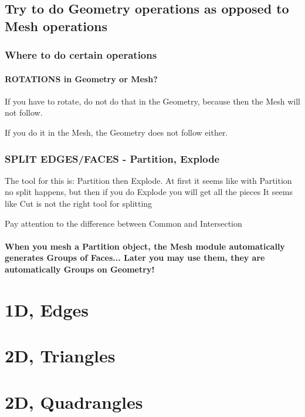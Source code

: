 \documentclass[10pt]{book}
\begin{document}
  
  
  \subsection{Try to do Geometry operations as opposed to Mesh operations}
 
  
  
  
  
  
 \subsubsection{Where to do certain operations}
 
  \paragraph{ROTATIONS in Geometry or Mesh?}


If you have to rotate, do not do that in the Geometry, because then the Mesh will not follow.

If you do it in the Mesh, the Geometry does not follow either.

\subsubsection{SPLIT EDGES/FACES - Partition, Explode}


The tool for this is: Partition then Explode. At first it seems like with Partition no split happens, but then if you do Explode you will get all the pieces
It seems like Cut is not the right tool for splitting

Pay attention to the difference between Common and Intersection


\paragraph{When you mesh a Partition object, the Mesh module automatically generates Groups of Faces... Later you may use them, they are automatically Groups on Geometry!}

 
 \section{1D, Edges}

 \section{2D, Triangles}
 
 \section{2D, Quadrangles}
\end{document}
